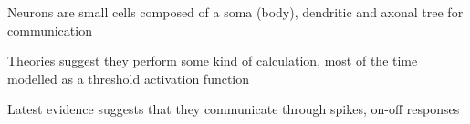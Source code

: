 Neurons are small cells composed of a soma (body), dendritic and axonal tree for communication

Theories suggest they perform some kind of calculation, most of the time modelled as a threshold activation function

Latest evidence suggests that they communicate through spikes, on-off responses


